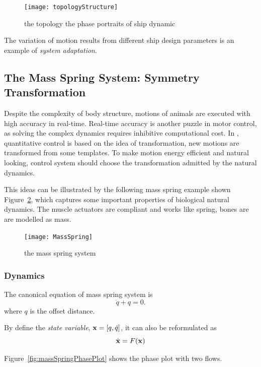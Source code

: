 \begin{figure}[!htbp]
  \begin{center}
   \texttt{[image: topologyStructure]}
   \caption{the topology  the phase portraits of ship dynamic}
   \label{fig:topologyStructure}
  \end{center}
\end{figure}

The variation of motion results from different ship design parameters is an example of \emph{system adaptation}.


\subsection{The Mass Spring System:  Symmetry Transformation}
Despite the complexity of body structure, motions of animals are executed with high accuracy in real-time.
Real-time accuracy is another puzzle in motor control, as solving the complex dynamics requires inhibitive computational cost.
In \moit, quantitative control is based on the idea of transformation, new motions are transformed from some templates.
To make motion energy efficient and natural looking, control system should choose the transformation admitted by the natural dynamics.

This ideas can be illustrated by the following mass spring example shown Figure~\ref{fig:massspring}, which captures some important properties of biological natural dynamics.
The muscle actuators are compliant and works like spring,  bones are are modelled as mass.

\begin{figure}[!htbp]
  \begin{center}
    \texttt{[image: MassSpring]}
    \caption{the mass spring system}
    \label{fig:massspring}
  \end{center}
\end{figure}

\subsubsection*{Dynamics}
The canonical equation of mass spring system is
\begin{equation}
\label{eq:mass-spring}
\ddot{q}+q=0.
\end{equation}
where $q$ is the offset distance.

By define the \emph{state variable}, $\mathbf{x}=[q,\dot{q}]$, it can also be reformulated as
\[
\dot{\mathbf{x}}=F(\mathbf{x})
\]

 Figure~\ref{fig:massSpringPhasePlot} shows the phase plot with two flows.


